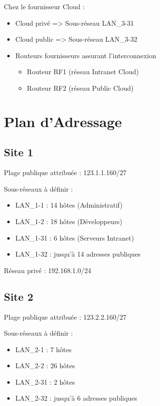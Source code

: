 \documentclass[11pt,a4paper]{article}
\begin{document}
	Chez le fournisseur Cloud :
	
	\begin{itemize}[label=$\bullet$]
		\item Cloud privé => Sous-réseau LAN\_3-31
		\item Cloud public => Sous-réseau LAN\_3-32
		\item Routeurs fournisseurs assurant l'interconnexion
		\begin{itemize}
			\item Routeur RF1 (réseau Intranet Cloud)
			\item Routeur RF2 (réseau Public Cloud)
		\end{itemize}
	\end{itemize}
	
	\section{Plan d’Adressage}
	
	\subsection{Site 1}
	
	Plage publique attribuée : 123.1.1.160/27
	
	Sous-réseaux à définir :
	
	\begin{itemize}
		\item LAN\_1-1 : 14  hôtes (Administratif)
		\item LAN\_1-2 : 18  hôtes (Développeurs)
		\item LAN\_1-31 : 6  hôtes (Serveurs Intranet)
		\item LAN\_1-32 : jusqu’à 14 adresses publiques
	\end{itemize}
	
	Réseau privé : 192.168.1.0/24
		
	\subsection{Site 2}
	
	Plage publique attribuée : 123.2.2.160/27
	
	Sous-réseaux à définir :
	
	\begin{itemize}
		\item LAN\_2-1 : 7  hôtes
		\item LAN\_2-2 : 26  hôtes
		\item LAN\_2-31 : 2 hôtes
		\item LAN\_2-32 : jusqu’à 6 adresses publiques
	\end{itemize}
	
\end{document}
